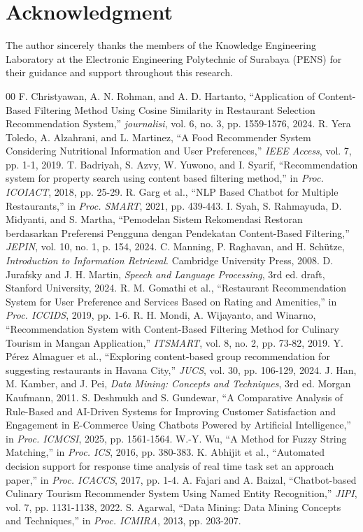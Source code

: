 \documentclass[conference]{IEEEtran}
\begin{document}
\section*{Acknowledgment}
The author sincerely thanks the members of the Knowledge Engineering Laboratory at the Electronic Engineering Polytechnic of Surabaya (PENS) for their guidance and support throughout this research.

\begin{thebibliography}{00}
 F. Christyawan, A. N. Rohman, and A. D. Hartanto, ``Application of Content-Based Filtering Method Using Cosine Similarity in Restaurant Selection Recommendation System,'' \textit{journalisi}, vol. 6, no. 3, pp. 1559-1576, 2024.
 R. Yera Toledo, A. Alzahrani, and L. Martinez, ``A Food Recommender System Considering Nutritional Information and User Preferences,'' \textit{IEEE Access}, vol. 7, pp. 1-1, 2019.
 T. Badriyah, S. Azvy, W. Yuwono, and I. Syarif, ``Recommendation system for property search using content based filtering method,'' in \textit{Proc. ICOIACT}, 2018, pp. 25-29.
 R. Garg et al., ``NLP Based Chatbot for Multiple Restaurants,'' in \textit{Proc. SMART}, 2021, pp. 439-443.
 I. Syah, S. Rahmayuda, D. Midyanti, and S. Martha, ``Pemodelan Sistem Rekomendasi Restoran berdasarkan Preferensi Pengguna dengan Pendekatan Content-Based Filtering,'' \textit{JEPIN}, vol. 10, no. 1, p. 154, 2024.
 C. Manning, P. Raghavan, and H. Schütze, \textit{Introduction to Information Retrieval}. Cambridge University Press, 2008.
 D. Jurafsky and J. H. Martin, \textit{Speech and Language Processing}, 3rd ed. draft, Stanford University, 2024.
 R. M. Gomathi et al., ``Restaurant Recommendation System for User Preference and Services Based on Rating and Amenities,'' in \textit{Proc. ICCIDS}, 2019, pp. 1-6.
 R. H. Mondi, A. Wijayanto, and Winarno, ``Recommendation System with Content-Based Filtering Method for Culinary Tourism in Mangan Application,'' \textit{ITSMART}, vol. 8, no. 2, pp. 73-82, 2019.
 Y. Pérez Almaguer et al., ``Exploring content-based group recommendation for suggesting restaurants in Havana City,'' \textit{JUCS}, vol. 30, pp. 106-129, 2024.
 J. Han, M. Kamber, and J. Pei, \textit{Data Mining: Concepts and Techniques}, 3rd ed. Morgan Kaufmann, 2011.
 S. Deshmukh and S. Gundewar, ``A Comparative Analysis of Rule-Based and AI-Driven Systems for Improving Customer Satisfaction and Engagement in E-Commerce Using Chatbots Powered by Artificial Intelligence,'' in \textit{Proc. ICMCSI}, 2025, pp. 1561-1564.
 W.-Y. Wu, ``A Method for Fuzzy String Matching,'' in \textit{Proc. ICS}, 2016, pp. 380-383.
 K. Abhijit et al., ``Automated decision support for response time analysis of real time task set an approach paper,'' in \textit{Proc. ICACCS}, 2017, pp. 1-4.
 A. Fajari and A. Baizal, ``Chatbot-based Culinary Tourism Recommender System Using Named Entity Recognition,'' \textit{JIPI}, vol. 7, pp. 1131-1138, 2022.
 S. Agarwal, ``Data Mining: Data Mining Concepts and Techniques,'' in \textit{Proc. ICMIRA}, 2013, pp. 203-207.
\end{thebibliography}
\end{document}
